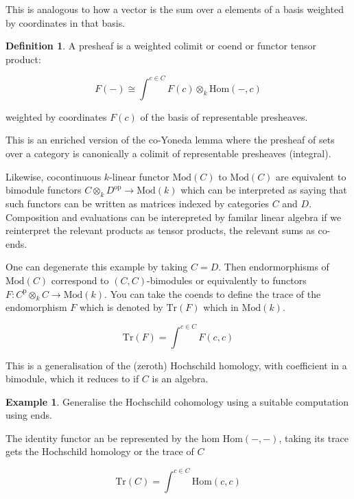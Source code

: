\documentclass[10pt]{article}
\theoremstyle{plain}%
\theoremstyle{definition}
\newtheorem{definition}{Definition}[section]
\newtheorem{example}{Example}[section]
\theoremstyle{remark}
\begin{document}
This is analogous to how a vector is the sum over a elements of a basis weighted by coordinates in that basis.

\begin{definition}
	A presheaf is a weighted colimit or coend or functor tensor product:

	\begin{equation}
		F(-) \cong \int^{c \in C}
		F(c) \otimes_k \mathrm{Hom}(-,c)
	\end{equation}

	weighted by coordinates $F(c)$ of the basis of representable presheaves.
\end{definition}

This is an enriched version of the co-Yoneda lemma where the presheaf of sets over a category is canonically a colimit of representable presheaves (integral).

Likewise, cocontinuous $k$-linear functor $\mathrm{Mod}(C)$ to $\mathrm{Mod}(C)$ are equivalent to bimodule functors $C \otimes_k D^\mathrm{op} \rightarrow \mathrm{Mod}(k)$ which can be interpreted as saying that such functors can be written as matrices indexed by categories $C$ and $D$. Composition and evaluations can be interepreted by familar linear algebra if we reinterpret the relevant products as tensor products, the relevant sums as co-ends.

One can degenerate this example by taking $C = D$. Then endormorphisms of $\mathrm{Mod}(C)$ correspond to $(C,C)$-bimodules or equivalently to functors $F : C^\mathrm{p} \otimes_k C \rightarrow \mathrm{Mod}(k)$. You can take the coends to define the trace of the endomorphism $F$ which is denoted by $\mathrm{Tr}(F)$ which in $\mathrm{Mod}(k)$.

\begin{equation}
	\mathrm{Tr}(F) = \int^{c \in C}
	F(c,c)
\end{equation}

This is a generalisation of the (zeroth) Hochschild homology, with coefficient in a bimodule, which it reduces to if $C$ is an algebra.

\begin{example}
	Generalise the Hochschild cohomology using a suitable computation using ends.
\end{example}

The identity functor an be represented by the hom $\mathrm{Hom(-,-)}$, taking its trace gets the Hochschild homology or the trace of $C$

\begin{equation}
	\mathrm{Tr}(C) = \int^{c \in C}
	\mathrm{Hom}(c,c)
\end{equation}
\end{document}
